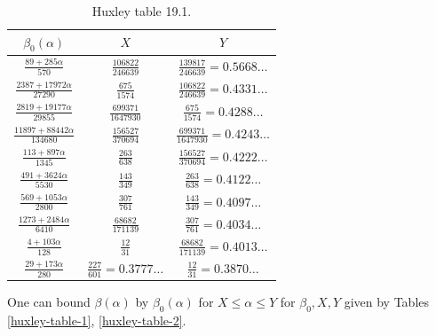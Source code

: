     \begin{table}[ht]
        \caption{Huxley table 19.1.}
        \centering
        \renewcommand{\arraystretch}{1.2}
        \begin{tabular}{|c|c|c|}
        \hline
        $\beta_0(\alpha)$  & $X$ & $Y$ \\
        \hline
        $\frac{89+285\alpha}{570}$ & $\frac{106822}{246639}$ & $\frac{139817}{246639}=0.5668\dots$ \\
        \hline
        $\frac{2387+17972\alpha}{27290}$ & $\frac{675}{1574}$ & $\frac{106822}{246639}=0.4331\dots$ \\
        \hline
        $\frac{2819+19177\alpha}{29855}$ & $\frac{699371}{1647930}$ & $\frac{675}{1574}=0.4288\dots$ \\
        \hline
        $\frac{11897+88442\alpha}{134680}$ & $\frac{156527}{370694}$ & $\frac{699371}{1647930}=0.4243\dots$ \\
        \hline
        $\frac{113+897\alpha}{1345}$ & $\frac{263}{638}$ & $\frac{156527}{370694} = 0.4222\dots$ \\
        \hline
        $\frac{491+3624\alpha}{5530}$ & $\frac{143}{349}$ & $\frac{263}{638} = 0.4122\dots$ \\
        \hline
        $\frac{569+1053\alpha}{2800}$ & $\frac{307}{761}$ & $\frac{143}{349} = 0.4097\dots$ \\
        \hline
        $\frac{1273+2484\alpha}{6410}$ & $\frac{68682}{171139}$ & $\frac{307}{761} = 0.4034\dots$ \\
        \hline
        $\frac{4+103\alpha}{128}$ & $\frac{12}{31}$ & $\frac{68682}{171139}=0.4013\dots$ \\
        \hline
        $\frac{29+173\alpha}{280}$ & $\frac{227}{601}=0.3777\dots$ & $\frac{12}{31} = 0.3870\dots$ \\
        \hline
        \end{tabular}
\end{table}\label{huxley-table-2}


\begin{theorem}\label{huxley-table}  One can bound $\beta(\alpha)$ by $\beta_0(\alpha)$ for $X \leq \alpha \leq Y$ for $\beta_0, X, Y$ given by Tables \ref{huxley-table-1}, \ref{huxley-table-2}.
\end{theorem}


\literature
{}\\

